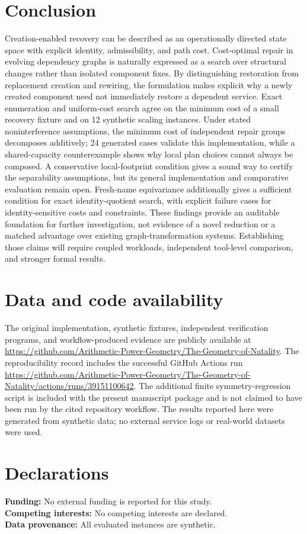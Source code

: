 \documentclass[11pt,a4paper]{article}
\begin{document}
\section{Conclusion}
Creation-enabled recovery can be described as an operationally directed state space with explicit identity, admissibility, and path cost. Cost-optimal repair in evolving dependency graphs is naturally expressed as a search over structural changes rather than isolated component fixes. By distinguishing restoration from replacement creation and rewiring, the formulation makes explicit why a newly created component need not immediately restore a dependent service. Exact enumeration and uniform-cost search agree on the minimum cost of a small recovery fixture and on 12 synthetic scaling instances. Under stated noninterference assumptions, the minimum cost of independent repair groups decomposes additively; 24 generated cases validate this implementation, while a shared-capacity counterexample shows why local plan choices cannot always be composed. A conservative local-footprint condition gives a sound way to certify the separability assumptions, but its general implementation and comparative evaluation remain open. Fresh-name equivariance additionally gives a sufficient condition for exact identity-quotient search, with explicit failure cases for identity-sensitive costs and constraints. These findings provide an auditable foundation for further investigation, not evidence of a novel reduction or a matched advantage over existing graph-transformation systems. Establishing those claims will require coupled workloads, independent tool-level comparison, and stronger formal results.

\section*{Data and code availability}
\begingroup\sloppy
The original implementation, synthetic fixtures, independent verification programs, and workflow-produced evidence are publicly available at \url{https://github.com/Arithmetic-Power-Geometry/The-Geometry-of-Natality}. The reproducibility record includes the successful GitHub Actions run \url{https://github.com/Arithmetic-Power-Geometry/The-Geometry-of-Natality/actions/runs/39151100642}. The additional finite symmetry-regression script is included with the present manuscript package and is not claimed to have been run by the cited repository workflow. The results reported here were generated from synthetic data; no external service logs or real-world datasets were used.

\endgroup
\section*{Declarations}
\noindent\textbf{Funding:} No external funding is reported for this study.\\
\textbf{Competing interests:} No competing interests are declared.\\
\textbf{Data provenance:} All evaluated instances are synthetic.

\printbibliography
\end{document}
